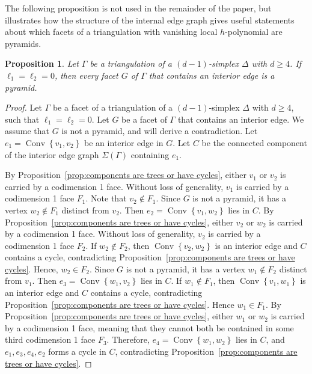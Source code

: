 \documentclass[10pt]{amsart}
\newtheorem{prop}[theorem]{Proposition}
\DeclareMathOperator{\Convop}{Conv}
\newcommand{\Conv}[1]{\Convop\left\{{#1}\right\}}
\begin{document}
The following proposition is not used in the remainder of the paper, but illustrates how 
the structure of the internal edge graph gives useful statements about which facets of a 
triangulation with vanishing local $h$-polynomial are pyramids.

\begin{prop} \label{prop:pyramid}
Let $\Gamma$ be a triangulation of a $(d - 1)$-simplex $\Delta$ with $d \ge 4$. If $\ell_1= \ell_2 = 0$,
then every facet $G$ of $\Gamma$ that contains an interior edge is a pyramid.
\end{prop}

\begin{proof}
Let $\Gamma$ be a facet of a triangulation of a $(d - 1)$-simplex $\Delta$ with $d \ge 4$, such that $\ell_1= \ell_2 = 0$. Let $G$ be a facet of $\Gamma$ that contains an interior edge. We assume that $G$ is not a pyramid, and will derive a contradiction. Let $e_1 = \Conv{v_1, v_2}$ be an interior edge in $G$. Let $C$ be the connected component of the interior edge graph $\Sigma(\Gamma)$ containing $e_1$. 

By Proposition~\ref{prop:components are trees or have cycles}, either $v_1$ or $v_2$ is carried by a codimension 1 face.
Without
loss of generality, $v_1$ is carried by a codimension 1 face $F_1$. Note that $v_2 \notin F_1$. Since $G$ is not a pyramid, it has a vertex $w_2 \notin F_1$ distinct from $v_2$. Then $e_2 = \Conv{v_1, w_2}$ lies in $C$.
By Proposition~\ref{prop:components are trees or have cycles}, either $v_2$ or $w_2$ is carried by a codimension 1 face. Without
loss of generality, $v_2$ is carried by a codimension 1 face $F_2$. If $w_2 \notin F_2$, then $\Conv{v_2, w_2}$
is an interior edge and $C$ contains a cycle, contradicting Proposition~\ref{prop:components are trees or have cycles}. 
Hence, $w_2 \in F_2$. Since $G$ is not a pyramid, it has a vertex $w_1 \notin F_2$ distinct from $v_1$.
Then $e_3 = \Conv{w_1, v_2}$ lies in $C$. If $w_1 \notin F_1$, then $\Conv{v_1, w_1}$
is an interior edge and $C$ contains a cycle, contradicting Proposition~\ref{prop:components are trees or have cycles}. 
Hence $w_1 \in F_1$. By Proposition~\ref{prop:components are trees or have cycles}, 
either $w_1$ or $w_2$ is carried by a codimension 1 face, meaning that they cannot both 
be contained in some third codimension 1 face $F_3$. Therefore, 
$e_4 = \Conv{w_1, w_2}$ lies in $C$, and $e_1,e_3,e_4,e_2$ forms a 
cycle in $C$, contradicting Proposition~\ref{prop:components are trees or have cycles}.
\end{proof}
\end{document}
